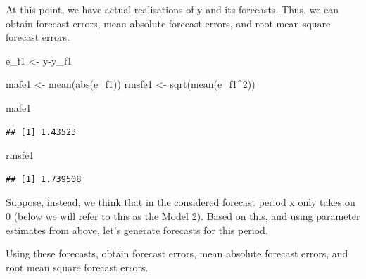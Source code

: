 \documentclass[
  12pt,
  oneside]{book}
\newenvironment{Shaded}{\begin{snugshade}}{\end{snugshade}}
\newcommand{\DecValTok}[1]{\textcolor[rgb]{0.00,0.00,0.81}{#1}}
\newcommand{\FunctionTok}[1]{\textcolor[rgb]{0.00,0.00,0.00}{#1}}
\newcommand{\NormalTok}[1]{#1}
\newcommand{\OtherTok}[1]{\textcolor[rgb]{0.56,0.35,0.01}{#1}}
\newcommand{\SpecialCharTok}[1]{\textcolor[rgb]{0.00,0.00,0.00}{#1}}
\begin{document}
At this point, we have actual realisations of y and its forecasts. Thus, we can obtain forecast errors, mean absolute forecast errors, and root mean square forecast errors.

\begin{Shaded}
\begin{Highlighting}[]
\NormalTok{e\_f1 }\OtherTok{\textless{}{-}}\NormalTok{ y}\SpecialCharTok{{-}}\NormalTok{y\_f1}

\NormalTok{mafe1 }\OtherTok{\textless{}{-}} \FunctionTok{mean}\NormalTok{(}\FunctionTok{abs}\NormalTok{(e\_f1))}
\NormalTok{rmsfe1 }\OtherTok{\textless{}{-}} \FunctionTok{sqrt}\NormalTok{(}\FunctionTok{mean}\NormalTok{(e\_f1}\SpecialCharTok{\^{}}\DecValTok{2}\NormalTok{))}

\NormalTok{mafe1}
\end{Highlighting}
\end{Shaded}

\begin{verbatim}
## [1] 1.43523
\end{verbatim}

\begin{Shaded}
\begin{Highlighting}[]
\NormalTok{rmsfe1}
\end{Highlighting}
\end{Shaded}

\begin{verbatim}
## [1] 1.739508
\end{verbatim}

Suppose, instead, we think that in the considered forecast period x only takes on 0 (below we will refer to this as the Model 2). Based on this, and using parameter estimates from above, let's generate forecasts for this period.

\begin{Shaded}
\end{Shaded}

Using these forecasts, obtain forecast errors, mean absolute forecast errors, and root mean square forecast errors.
\end{document}
